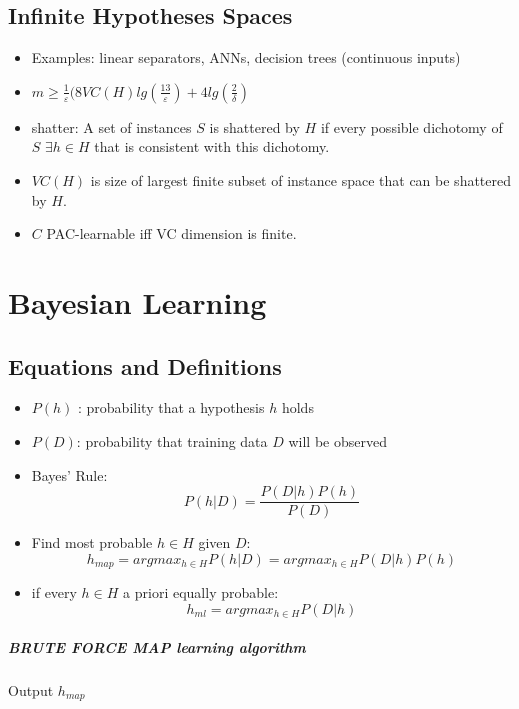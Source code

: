\documentclass[11pt]{article}
\begin{document}
\subsection{Infinite Hypotheses Spaces}
\begin{itemize}
\item Examples: linear separators, ANNs, decision trees (continuous inputs)
\item $m \geq \frac{1}{\varepsilon} (8VC(H)lg(\frac{13}{\varepsilon}) + 4 lg( \frac{2}{\delta})$
\item shatter: A set of instances $S$ is shattered by $H$ if every possible dichotomy of $S$ $\exists h \in H$ that is consistent with this dichotomy.
\item $VC(H)$ is size of largest finite subset of instance space that can be shattered by $H$.
\item $C$ PAC-learnable iff VC dimension is finite.
\end{itemize}


\section{Bayesian Learning}
\subsection{Equations and Definitions}
\begin{itemize}
\item $P(h)$ : probability that a hypothesis $h$ holds
\item $P(D)$: probability that training data $D$ will be observed
\item Bayes' Rule: $$P(h|D) = \frac{P(D|h)P(h)}{P(D)}$$
\item Find most probable $h \in H$ given $D$: $$h_{map} = argmax_{h \in H} P(h|D) = argmax_{h \in H} P(D|h)P(h)$$
\item if every $h\in H$ a priori equally probable: $$h_{ml} = argmax_{h \in H} P(D|h)$$
\end{itemize}

\subparagraph{BRUTE FORCE MAP learning algorithm}
Output $h_{map}$
\end{document}

